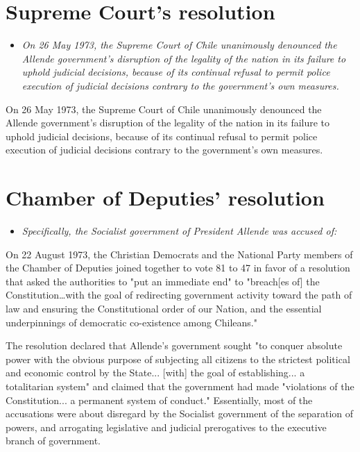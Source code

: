 \section{Supreme Court's resolution}\label{supreme-courts-resolution}

\begin{itemize}
\item
  \emph{On 26 May 1973, the Supreme Court of Chile unanimously denounced
  the Allende government's disruption of the legality of the nation in
  its failure to uphold judicial decisions, because of its continual
  refusal to permit police execution of judicial decisions contrary to
  the government's own measures.}
\end{itemize}

On 26 May 1973, the Supreme Court of Chile unanimously denounced the
Allende government's disruption of the legality of the nation in its
failure to uphold judicial decisions, because of its continual refusal
to permit police execution of judicial decisions contrary to the
government's own measures.

\section{Chamber of Deputies'
resolution}\label{chamber-of-deputies-resolution}

\begin{itemize}
\item
  \emph{Specifically, the Socialist government of President Allende was
  accused of:}
\end{itemize}

On 22 August 1973, the Christian Democrats and the National Party
members of the Chamber of Deputies joined together to vote 81 to 47 in
favor of a resolution that asked the authorities to "put an immediate
end" to "breach{[}es of{]} the Constitution\ldots{}with the goal of
redirecting government activity toward the path of law and ensuring the
Constitutional order of our Nation, and the essential underpinnings of
democratic co-existence among Chileans."

The resolution declared that Allende's government sought "to conquer
absolute power with the obvious purpose of subjecting all citizens to
the strictest political and economic control by the State... {[}with{]}
the goal of establishing... a totalitarian system" and claimed that the
government had made "violations of the Constitution... a permanent
system of conduct." Essentially, most of the accusations were about
disregard by the Socialist government of the separation of powers, and
arrogating legislative and judicial prerogatives to the executive branch
of government.

